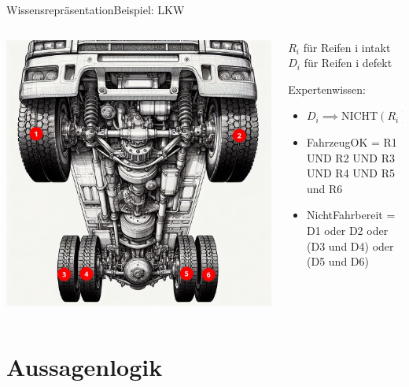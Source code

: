 \documentclass[xelatex,aspectratio=169]{beamer}
\begin{document}
\begin{frame}{Wissensrepräsentation}{Beispiel: LKW}
  \begin{columns}
    \begin{column}{0.5\textwidth}
      \includegraphics[width=\textwidth]{img/lkw_bottom.jpg}
    \end{column}
    \begin{column}{0.5\textwidth}
      \(R_i\) für Reifen i intakt \\
      \(D_i\) für Reifen i defekt

      Expertenwissen:

      \begin{itemize}
        \item \(D_i \implies \mbox{NICHT}(R_i)\)
        \item FahrzeugOK = R1 UND R2 UND R3 UND R4 UND R5 und R6
        \item NichtFahrbereit = D1 oder D2 oder (D3 und D4) oder (D5 und D6)
      \end{itemize}
    \end{column}
  \end{columns}
\end{frame}

\section{Aussagenlogik}
\end{document}
